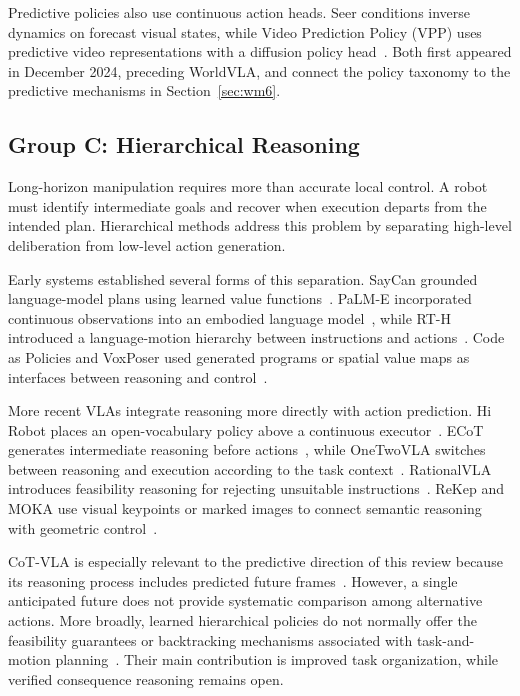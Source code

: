 \documentclass{ieeeaccess}
\begin{document}
\textcolor[RGB]{104,48,148}{Predictive policies also use continuous action heads. Seer conditions inverse dynamics on forecast visual states, while Video Prediction Policy (VPP) uses predictive video representations with a diffusion policy head~\cite{seer,vpp}. Both first appeared in December 2024, preceding WorldVLA, and connect the policy taxonomy to the predictive mechanisms in Section~\ref{sec:wm6}.}

\subsection{Group C: Hierarchical Reasoning}
\label{sec:groupC}

Long-horizon manipulation requires more than accurate local control. A robot must identify intermediate goals and recover when execution departs from the intended plan. Hierarchical methods address this problem by separating high-level deliberation from low-level action generation.

Early systems established several forms of this separation. SayCan grounded language-model plans using learned value functions~\cite{saycan}. PaLM-E incorporated continuous observations into an embodied language model~\cite{palme}, while RT-H introduced a language-motion hierarchy between instructions and actions~\cite{rth}. Code as Policies and VoxPoser used generated programs or spatial value maps as interfaces between reasoning and control~\cite{codeaspolicies,voxposer}.

More recent VLAs integrate reasoning more directly with action prediction. Hi Robot places an open-vocabulary policy above a continuous executor~\cite{hirobot}. ECoT generates intermediate reasoning before actions~\cite{ecot}, while OneTwoVLA switches between reasoning and execution according to the task context~\cite{onetwovla}. RationalVLA introduces feasibility reasoning for rejecting unsuitable instructions~\cite{rationalvla}. ReKep and MOKA use visual keypoints or marked images to connect semantic reasoning with geometric control~\cite{rekep,moka}.

CoT-VLA is especially relevant to the predictive direction of this review because its reasoning process includes predicted future frames~\cite{cotvla}. However, a single anticipated future does not provide systematic comparison among alternative actions. More broadly, learned hierarchical policies do not normally offer the feasibility guarantees or backtracking mechanisms associated with task-and-motion planning~\cite{ontollmtamp}. Their main contribution is improved task organization, while verified consequence reasoning remains open.
\end{document}
